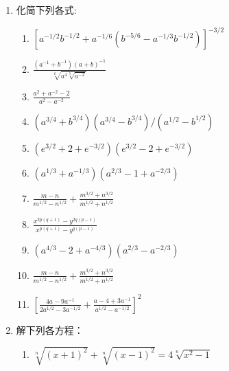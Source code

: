 \begin{enumerate}
\item  化简下列各式:
\begin{enumerate}
\item  $\left[a^{-1 / 2} b^{-1 / 2}+a^{-1 / 6}\left(b^{-5 / 6}-a^{-1 / 3} b^{-1 / 2}\right)\right]^{-3 / 2}$
\item  $\frac{\left(a^{-1}+b^{-1}\right)(a+b)^{-1}}{\sqrt[6]{a^{4} \sqrt[5]{a^{-2}}}}$
\item  $\frac{a^{2}+a^{-2}-2}{a^{2}-a^{-2}}$
\item  $\left(a^{3 / 4}+b^{3 / 4}\right)\left(a^{3 / 4}-b^{3 / 4}\right) /\left(a^{1 / 2}-b^{1 / 2}\right)$
\item  $\left(e^{3 / 2}+2+e^{-3 / 2}\right)\left(e^{3 / 2}-2+e^{-3 / 2}\right)$
\item  $\left(a^{1 / 3}+a^{-1 / 3}\right)\left(a^{2 / 3}-1+a^{-2 / 3}\right)$
\item  $\frac{m-n}{m^{1 / 2}-n^{1 / 2}}+\frac{m^{3 / 2}+n^{3/2}}{m^{1 / 2}+n^{1 / 2}}$
\item  $\frac{x^{2 p(q+1)}-y^{2 q(p-1)}}{x^{p(q+1)}-y^{q(p-1)}}$
\item  $\left(a^{4 / 3}-2+a^{-4 / 3}\right)\left(a^{2 / 3}-a^{-2 / 3}\right)$
\item  $\frac{m-n}{m^{1 / 2}-n^{1 / 2}}+\frac{m^{3 / 2}+n^{3/2}}{m^{1 / 2}+n^{1 / 2}}$
\item  $\left[\frac{4 a-9 a^{-1}}{2 a^{1 / 2}-3 a^{-1 / 2}}+\frac{a-4+3 a^{-1}}{a^{1 / 2}-a^{-1 / 2}}\right]^{2}$
\end{enumerate}

\item  解下列各方程：
  \begin{enumerate}
  \item  $\sqrt[n]{(x+1)^{2}}+\sqrt[n]{(x-1)^{2}}=4 \sqrt[n]{x^{2}-1}$
\end{enumerate}


\end{enumerate}
